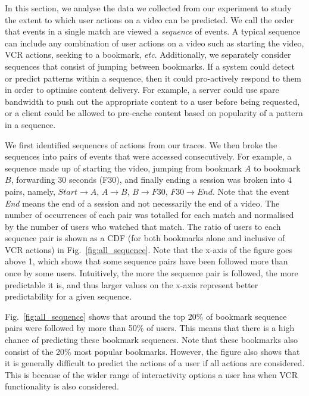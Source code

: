 \documentclass[letterpaper,nocopyrightspace]{sig-alternate}
\begin{document}
In this section, we analyse the data we collected from our
experiment to study the extent to which user actions on a video can
be predicted. We call the order that events in a single match are
viewed a {\em sequence} of events. A typical sequence can include
any combination of user actions on a video such as starting the
video, VCR actions, seeking to a bookmark, \emph{etc}. Additionally,
we separately consider sequences that consist of jumping between
bookmarks. If a system could detect or predict patterns within a
sequence, then it could pro-actively respond to them in order to
optimise content delivery. For example, a server could use spare
bandwidth to push out the appropriate content to a user before being
requested, or a client could be allowed to pre-cache content based
on popularity of a pattern in a sequence.

We first identified sequences of actions from our traces. We then
broke the sequences into pairs of events that were accessed
consecutively. For example, a sequence made up of starting the
video, jumping from bookmark $A$ to bookmark $B$, forwarding 30
seconds (F30), and finally ending a session was broken into 4 pairs,
namely, $Start \rightarrow A$, $A \rightarrow B$, $B \rightarrow
F30$, $F30 \rightarrow End$. Note that the event {\em End} means the
end of a session and not necessarily the end of a video. The number
of occurrences of each pair was totalled for each match and
normalised by the number of users who watched that match. The ratio
of users to each sequence pair is shown as a CDF (for both bookmarks
alone and inclusive of VCR actions) in Fig.~\ref{fig:all_sequence}.
Note that the x-axis of the figure goes above 1, which shows that
some sequence pairs have been followed more than once by some users.
Intuitively, the more the sequence pair is followed, the more
predictable it is, and thus larger values on the x-axis represent
better predictability for a given sequence.

Fig.~\ref{fig:all_sequence} shows that around the top 20\% of
bookmark sequence pairs were followed by more than 50\% of users.
This means that there is a high chance of predicting these bookmark
sequences. Note that these bookmarks also consist of the 20\% most
popular bookmarks. However, the figure also shows that it is
generally difficult to predict the actions of a user if all actions
are considered. This is because of the wider range of interactivity
options a user has when VCR functionality is also considered.
\end{document}
